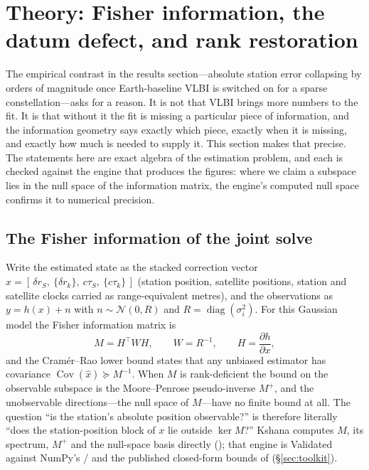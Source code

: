 \section{Theory: Fisher information, the datum defect, and rank restoration}
\label{sec:theory}

The empirical contrast in the results section---absolute station error collapsing
by orders of magnitude once Earth-baseline VLBI is switched on for a sparse
constellation---asks for a reason. It is not that VLBI brings more numbers to the
fit. It is that without it the fit is missing a particular piece of information,
and the information geometry says exactly which piece, exactly when it is missing,
and exactly how much is needed to supply it. This section makes that precise. The
statements here are exact algebra of the estimation problem, and each is checked
against the engine that produces the figures: where we claim a subspace lies in
the null space of the information matrix, the engine's computed null space confirms
it to numerical precision.

\subsection{The Fisher information of the joint solve}

Write the estimated state as the stacked correction vector
$x = [\,\delta r_S,\ \{\delta r_k\},\ c\tau_S,\ \{c\tau_k\}\,]$ (station position,
satellite positions, station and satellite clocks carried as range-equivalent
metres), and the observations as $y = h(x) + n$ with $n \sim \mathcal{N}(0,R)$ and
$R = \operatorname{diag}(\sigma_i^2)$. For this Gaussian model the Fisher
information matrix is
\begin{equation}
  M = H^{\top} W H, \qquad W = R^{-1}, \qquad H = \frac{\partial h}{\partial x},
  \label{eq:fim}
\end{equation}
and the Cram\'er--Rao lower bound states that any unbiased estimator has
covariance $\operatorname{Cov}(\hat x) \succeq M^{-1}$. When $M$ is rank-deficient
the bound on the observable subspace is the Moore--Penrose pseudo-inverse $M^{+}$,
and the unobservable directions---the null space of $M$---have no finite bound at
all. The question ``is the station's absolute position observable?'' is therefore
literally ``does the station-position block of $x$ lie outside $\ker M$?'' Kshana
computes $M$, its spectrum, $M^{+}$ and the null-space basis directly
(); that engine is Validated against NumPy's /
and the published closed-form bounds of \citet{kay1993} (\S\ref{sec:toolkit}).

